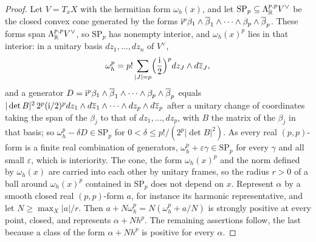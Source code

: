 \begin{proof}
Let $V=T_{x}X$ with the hermitian form $\omega_{h}(x)$, and let
$\mathrm{SP}_{p}\subseteq\Lambda^{p,p}_{\mathbb{R}}V^{\vee}$ be the closed convex cone
generated by the forms $\mathrm{i}^{p}\beta_{1}\wedge\overline{\beta}_{1}\wedge\cdots
\wedge\beta_{p}\wedge\overline{\beta}_{p}$. These forms span
$\Lambda^{p,p}_{\mathbb{R}}V^{\vee}$, so $\mathrm{SP}_{p}$ has nonempty interior, and
$\omega_{h}(x)^{p}$ lies in that interior: in a unitary basis $dz_{1},\dots,
dz_{n}$ of $V^{\vee}$,
\[
  \omega_{h}^{p}=p!\sum_{|J|=p}\Bigl(\frac{\mathrm{i}}{2}\Bigr)^{p}
  dz_{J}\wedge d\overline{z}_{J},
\]
and a generator $D=\mathrm{i}^{p}\beta_{1}\wedge\overline{\beta}_{1}\wedge\cdots\wedge
\beta_{p}\wedge\overline{\beta}_{p}$ equals $|\det B|^{2}\,2^{p}(\mathrm{i}/2)^{p}
dz_{1}\wedge d\overline{z}_{1}\wedge\cdots\wedge dz_{p}\wedge d\overline{z}_{p}$ after a
unitary change of coordinates taking the span of the $\beta_{j}$ to that of
$dz_{1},\dots,dz_{p}$, with $B$ the matrix of the $\beta_{j}$ in that basis;
so $\omega_{h}^{p}-\delta D\in\mathrm{SP}_{p}$ for $0<\delta\le p!/(2^{p}
|\det B|^{2})$. As every real $(p,p)$-form is a finite real combination of
generators, $\omega_{h}^{p}+\varepsilon\gamma\in\mathrm{SP}_{p}$ for every
$\gamma$ and all small $\varepsilon$, which is interiority. The cone, the form
$\omega_{h}(x)^{p}$ and the norm defined by $\omega_{h}(x)$ are carried into
each other by unitary frames, so the radius $r>0$ of a ball around
$\omega_{h}(x)^{p}$ contained in $\mathrm{SP}_{p}$ does not depend on $x$.
Represent $\alpha$ by a smooth closed real $(p,p)$-form $a$, for instance its
harmonic representative, and let $N\ge\max_{X}|a|/r$. Then
$a+N\omega_{h}^{p}=N(\omega_{h}^{p}+a/N)$ is strongly positive at every point,
closed, and represents $\alpha+Nh^{p}$. The remaining assertions follow, the
last because a class of the form $\alpha+Nh^{p}$ is positive for every $\alpha$.
\end{proof}

